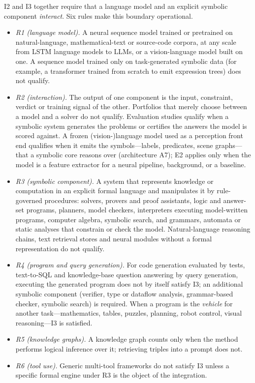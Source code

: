 I2 and I3 together require that a language model and an explicit symbolic component \emph{interact}. Six rules make this boundary operational.
\begin{itemize}
  \item \emph{R1 (language model).} A neural sequence model trained or pretrained on natural-language, mathematical-text or source-code corpora, at any scale from LSTM language models to LLMs, or a vision-language model built on one. A sequence model trained only on task-generated symbolic data (for example, a transformer trained from scratch to emit expression trees) does not qualify.
  \item \emph{R2 (interaction).} The output of one component is the input, constraint, verdict or training signal of the other. Portfolios that merely choose between a model and a solver do not qualify. Evaluation studies qualify when a symbolic system generates the problems or certifies the answers the model is scored against. A frozen (vision-)language model used as a perception front end qualifies when it emits the symbols---labels, predicates, scene graphs---that a symbolic core reasons over (architecture A7); E2 applies only when the model is a feature extractor for a neural pipeline, background, or a baseline.
  \item \emph{R3 (symbolic component).} A system that represents knowledge or computation in an explicit formal language and manipulates it by rule-governed procedures: solvers, provers and proof assistants, logic and answer-set programs, planners, model checkers, interpreters executing model-written programs, computer algebra, symbolic search, and grammars, automata or static analyses that constrain or check the model. Natural-language reasoning chains, text retrieval stores and neural modules without a formal representation do not qualify.
  \item \emph{R4 (program and query generation).} For code generation evaluated by tests, text-to-SQL and knowledge-base question answering by query generation, executing the generated program does not by itself satisfy I3; an additional symbolic component (verifier, type or dataflow analysis, grammar-based checker, symbolic search) is required. When a program is the \emph{vehicle} for another task---mathematics, tables, puzzles, planning, robot control, visual reasoning---I3 is satisfied.
  \item \emph{R5 (knowledge graphs).} A knowledge graph counts only when the method performs logical inference over it; retrieving triples into a prompt does not.
  \item \emph{R6 (tool use).} Generic multi-tool frameworks do not satisfy I3 unless a specific formal engine under R3 is the object of the integration.
\end{itemize}
